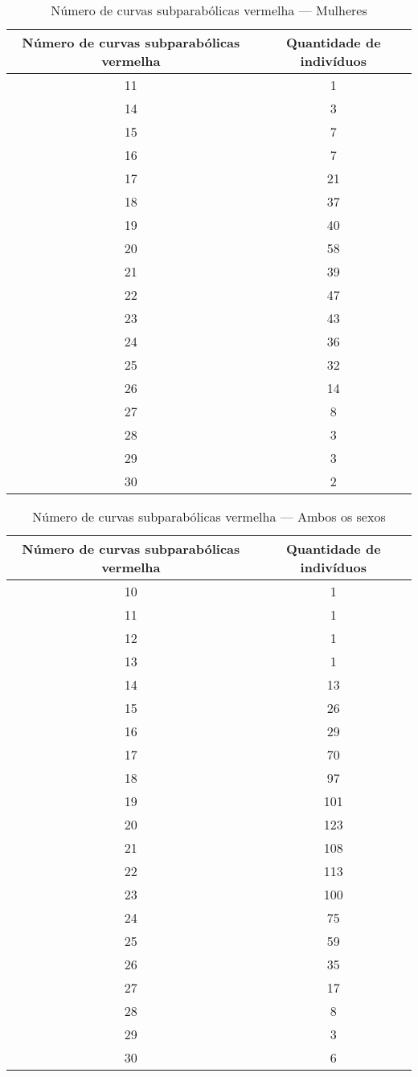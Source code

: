 \documentclass[a4paper,12pt]{article}
\begin{document}
\begin{table}[h!]
\centering
\caption{Número de curvas subparabólicas vermelha — Mulheres}
\begin{tabular}{c c}
\hline
\textbf{Número de curvas subparabólicas vermelha} & \textbf{Quantidade de indivíduos} \\ 
\hline
11 & 1  \\
14 & 3  \\
15 & 7  \\
16 & 7  \\
17 & 21 \\
18 & 37 \\
19 & 40 \\
20 & 58 \\
21 & 39 \\
22 & 47 \\
23 & 43 \\
24 & 36 \\
25 & 32 \\
26 & 14 \\
27 & 8  \\
28 & 3  \\
29 & 3  \\
30 & 2  \\
\hline
\end{tabular}
\end{table}


\begin{table}[h!]
\centering
\caption{Número de curvas subparabólicas vermelha — Ambos os sexos}
\begin{tabular}{c c}
\hline
\textbf{Número de curvas subparabólicas vermelha} & \textbf{Quantidade de indivíduos} \\ 
\hline
10 & 1  \\
11 & 1  \\
12 & 1  \\
13 & 1  \\
14 & 13 \\
15 & 26 \\
16 & 29 \\
17 & 70 \\
18 & 97 \\
19 & 101 \\
20 & 123 \\
21 & 108 \\
22 & 113 \\
23 & 100 \\
24 & 75 \\
25 & 59 \\
26 & 35 \\
27 & 17 \\
28 & 8  \\
29 & 3  \\
30 & 6  \\
\hline
\end{tabular}
\end{table}
\end{document}
